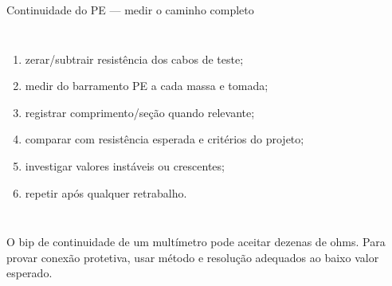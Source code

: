 \begin{frame}{Continuidade do PE — medir o caminho completo}
\scriptsize
\begin{columns}[T,onlytextwidth]
\begin{enumerate}
\item zerar/subtrair resistência dos cabos de teste;
\item medir do barramento PE a cada massa e tomada;
\item registrar comprimento/seção quando relevante;
\item comparar com resistência esperada e critérios do projeto;
\item investigar valores instáveis ou crescentes;
\item repetir após qualquer retrabalho.
\end{enumerate}
\end{columns}
\begin{caixaAt}
O bip de continuidade de um multímetro pode aceitar dezenas de ohms. Para provar conexão protetiva, usar método e resolução adequados ao baixo valor esperado.
\end{caixaAt}
\end{frame}

